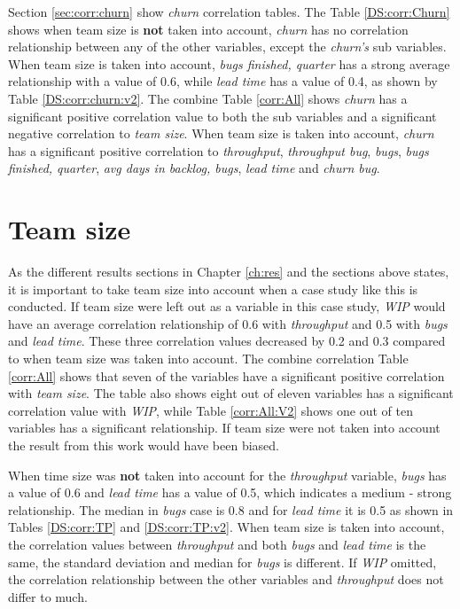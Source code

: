 \documentclass[UKenglish]{ifimaster}  %
\begin{document}
Section \ref{sec:corr:churn} show \textit{churn} correlation tables. The Table \ref{DS:corr:Churn} shows when team size is \textbf{not} taken into account, \textit{churn} has no correlation relationship between any of the other variables, except the \textit{churn's} sub variables. When  team size is taken into account, \textit{bugs finished, quarter} has a strong average relationship with a value of 0.6, while \textit{lead time} has a value of 0.4, as shown by Table \ref{DS:corr:churn:v2}. The combine Table \ref{corr:All} shows \textit{churn} has a significant positive correlation value to both the sub variables and a significant negative correlation to \textit{team size}. When team size is taken into account, \textit{churn} has a significant positive correlation to \textit{throughput}, \textit{throughput bug}, \textit{bugs}, \textit{bugs finished, quarter}, \textit{avg days in backlog, bugs}, \textit{lead time} and \textit{churn bug}. 


\section{Team size}
As the different results sections in Chapter \ref{ch:res} and the sections above states, it is important to take team size into account when a case study like this is conducted. If team size were left out as a variable in this case study, \textit{WIP} would have an average correlation relationship of 0.6 with \textit{throughput} and 0.5 with \textit{bugs} and \textit{lead time}. These three correlation values decreased by 0.2  and 0.3 compared to when  team size was taken into account. The combine correlation Table  \ref{corr:All} shows that seven of the variables have a significant positive correlation with \textit{team size}. The table also shows eight out of eleven variables has a significant correlation value with \textit{WIP}, while Table \ref{corr:All:V2} shows one out of ten variables has a significant relationship. If team size were not taken into account the result from this work would have been biased. 


\iffalse
When time size was \textbf{not} taken into account for the \textit{throughput} variable, \textit{bugs} has a value of 0.6 and \textit{lead time} has a value of 0.5, which indicates a medium - strong relationship. The median in \textit{bugs} case is 0.8 and for \textit{lead time} it is 0.5 as shown in Tables \ref{DS:corr:TP} and \ref{DS:corr:TP:v2}. When team size is taken into account, the correlation values between \textit{throughput} and both \textit{bugs} and \textit{lead time} is the same, the standard deviation and median for \textit{bugs} is different.  If \textit{WIP} omitted, the correlation relationship between the other variables and \textit{throughput} does not differ to much.
\end{document}
